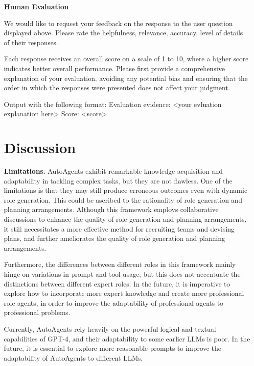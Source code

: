 \noindent
\begin{frame}[Text]{\textbf{Human Evaluation}}
\begin{code}
We would like to request your feedback on the response to the user question
displayed above. Please rate the helpfulness, relevance, accuracy, level of 
details of their responses. 

Each response receives an overall score on a scale of 1 to 10, where a higher 
score indicates better overall performance. Please first provide a 
comprehensive explanation of your evaluation, avoiding any potential bias and 
ensuring that the order in which the responses were presented does not affect 
your judgment. 

Output with the following format:
Evaluation evidence: <your evluation explanation here>
Score: <score>
\end{code}
\end{frame}

\section{Discussion}

\noindent\textbf{Limitations.}
AutoAgents exhibit remarkable knowledge acquisition and adaptability in tackling complex tasks, but they are not flawless. One of the limitations is that they may still produce erroneous outcomes even with dynamic role generation. This could be ascribed to the rationality of role generation and planning arrangements. Although this framework employs collaborative discussions to enhance the quality of role generation and planning arrangements, it still necessitates a more effective method for recruiting teams and devising plans, and further ameliorates the quality of role generation and planning arrangements.

Furthermore, the differences between different roles in this framework mainly hinge on variations in prompt and tool usage, but this does not accentuate the distinctions between different expert roles. In the future, it is imperative to explore how to incorporate more expert knowledge and create more professional role agents, in order to improve the adaptability of professional agents to professional problems.

Currently, AutoAgents rely heavily on the powerful logical and textual capabilities of GPT-4, and their adaptability to some earlier LLMs is poor. In the future, it is essential to explore more reasonable prompts to improve the adaptability of AutoAgents to different LLMs.

